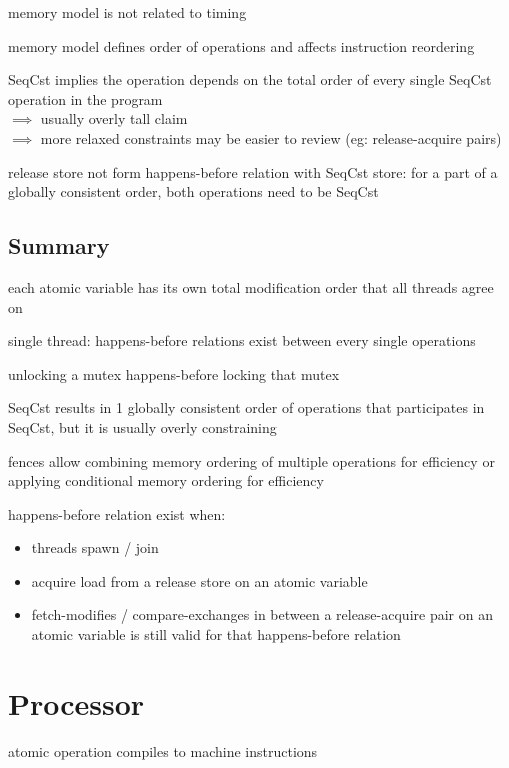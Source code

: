 \documentclass[8pt]{extarticle}
\begin{document}
\begin{multicols*}{2}
    memory model is not related to timing

    memory model defines order of operations and affects instruction reordering

    SeqCst implies the operation depends on the total order of every single SeqCst operation in the program\\
    $\implies$ usually overly tall claim\\
    $\implies$ more relaxed constraints may be easier to review (eg: release-acquire pairs)

    release store not form happens-before relation with SeqCst store: for a part of a globally consistent order, both operations need to be SeqCst

    \subsection{Summary}

    each atomic variable has its own total modification order that all threads agree on

    single thread: happens-before relations exist between every single operations

    unlocking a mutex happens-before locking that mutex

    SeqCst results in 1 globally consistent order of operations that participates in SeqCst, but it is usually overly constraining

    fences allow combining memory ordering of multiple operations for efficiency or applying conditional memory ordering for efficiency

    happens-before relation exist when:
    \begin{itemize}
    \item threads spawn / join
    \item acquire load from a release store on an atomic variable
    \item fetch-modifies / compare-exchanges in between a release-acquire pair on an atomic variable is still valid for that happens-before relation
    \end{itemize}

    \vfill\null
    \columnbreak

    \section{Processor}

    atomic operation compiles to machine instructions


\end{multicols*}
\end{document}
